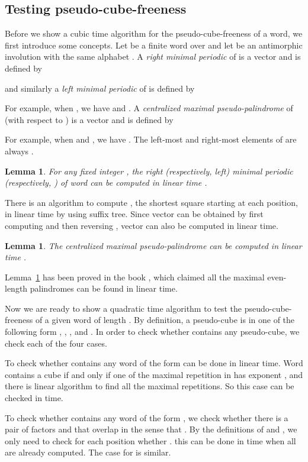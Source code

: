 \documentclass[12pt]{article}
\newtheorem{lemma}[theorem]{Lemma}
\begin{document}
\subsection{Testing pseudo-cube-freeness}
Before we show a cubic time algorithm for the pseudo-cube-freeness
of a word, we first introduce some concepts. Let  be
a finite word over  and let  be an antimorphic
involution with the same alphabet . A \emph{right minimal
periodic}  of  is a vector and is defined by
  
and similarly a \emph{left minimal periodic}  of
 is defined by
  
For example, when , we have
 and
. A
\emph{centralized maximal pseudo-palindrome}  of
 (with respect to ) is a vector and is defined by
  
For example, when  and , we have
. The left-most and right-most elements
of  are always .


\begin{lemma}\label{lemma:rmplmp}
For any fixed integer , the right (respectively, left) minimal
periodic  (respectively, ) of word  can be computed
in linear time .
\end{lemma}
There is an algorithm to compute , the shortest square
starting at each position, in linear time \cite{Kosaraju1994} by
using suffix tree. Since vector  can be obtained by first
computing  and then reversing , vector
 can also be computed in linear time.


\begin{lemma}\label{lemma:cmp}
The centralized maximal pseudo-palindrome  can be computed in
linear time .
\end{lemma}
Lemma~\ref{lemma:cmp} has been proved in the book
\cite[page~197--198]{Gusfield1997}, which claimed all the maximal
even-length palindromes can be found in linear time.


Now we are ready to show a quadratic time algorithm to test the
pseudo-cube-freeness of a given word  of length . By
definition, a pseudo-cube is in one of the following form ,
, , and . In order to check whether
 contains any pseudo-cube, we check each of the four cases.


To check whether  contains any word of the form  can be done
in linear time. Word  contains a cube if and only if one of the
maximal repetition in  has exponent , and there is linear
algorithm \cite{Kolpakov&Kucherov1999} to find all the maximal
repetitions. So this case can be checked in  time.


To check whether  contains any word of the form , we
check whether there is a pair of factors  and
 that overlap in the sense that . By the definitions of  and , we only need to check
for each position  whether . this can be
done in  time when all  are already computed. The
case for  is similar.
\end{document}
